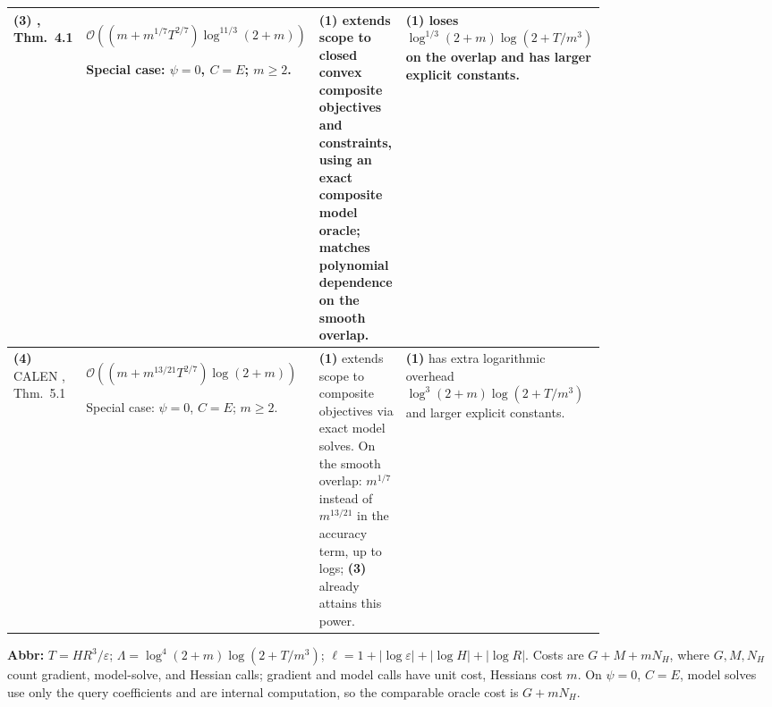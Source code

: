 \begin{table}[tp]
\begin{threeparttable}
\begin{tabularx}{\linewidth}{@{}>{\raggedright\arraybackslash}p{0.20\linewidth}>{\raggedright\arraybackslash}p{0.29\linewidth}>{\raggedright\arraybackslash}p{0.28\linewidth}>{\raggedright\arraybackslash}X@{}}
\midrule
\textbf{(3)} \citep{clhZhangChenLiuZhang2026v1}, Thm.~4.1
& $\mathcal{O}\!\left((m+m^{1/7}T^{2/7})\log^{11/3}(2+m)\right)$\par Special case: $\psi=0$, $C=E$; $m\ge2$.
& \textbf{(1)} extends scope to closed convex composite objectives and constraints, using an exact composite model oracle; matches polynomial dependence on the smooth overlap.
& \textbf{(1)} loses $\log^{1/3}(2+m)\log(2+T/m^3)$ on the overlap and has larger explicit constants. \\
\midrule
\textbf{(4)} CALEN \citep{clhChenLiuLuoZhang2026v3}, Thm.~5.1
& $\mathcal{O}\!\left((m+m^{13/21}T^{2/7})\log(2+m)\right)$\par Special case: $\psi=0$, $C=E$; $m\ge2$.
& \textbf{(1)} extends scope to composite objectives via exact model solves. On the smooth overlap: $m^{1/7}$ instead of $m^{13/21}$ in the accuracy term, up to logs; \textbf{(3)} already attains this power.
& \textbf{(1)} has extra logarithmic overhead $\log^3(2+m)\log(2+T/m^3)$ and larger explicit constants. \\
\bottomrule
\end{tabularx}
\begin{tablenotes}[flushleft]\footnotesize
\item[] \textbf{Abbr:} $T=HR^3/\varepsilon$; $\Lambda=\log^4(2+m)\log(2+T/m^3)$; $\ell=1+|\log\varepsilon|+|\log H|+|\log R|$. Costs are $G+M+mN_H$, where $G,M,N_H$ count gradient, model-solve, and Hessian calls; gradient and model calls have unit cost, Hessians cost $m$. On $\psi=0$, $C=E$, model solves use only the query coefficients and are internal computation, so the comparable oracle cost is $G+mN_H$.
\end{tablenotes}
\end{threeparttable}
\end{table}
\clearpage
